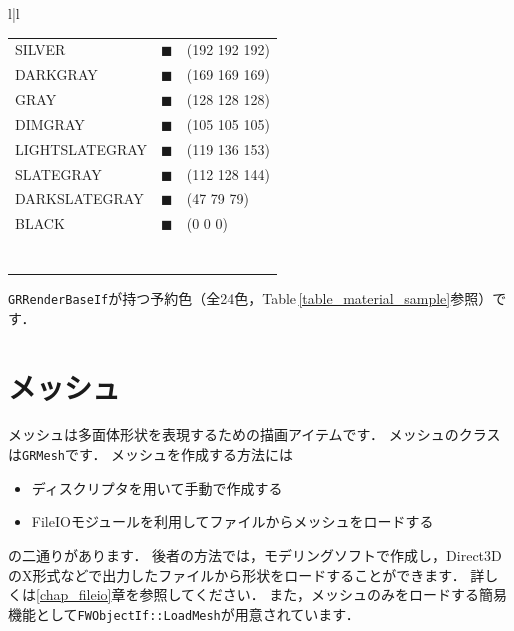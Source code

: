 \begin{table}[t]
{\begin{center}
\begin{tabular}{l|l}
\begin{tabular}{lll}
SILVER				& {\color[RGB]{192,192,192}$\blacksquare$}	& (192 192 192)	\\
DARKGRAY			& {\color[RGB]{169,169,169}$\blacksquare$}	& (169 169 169)	\\
GRAY				& {\color[RGB]{128,128,128}$\blacksquare$}	& (128 128 128)	\\
DIMGRAY				& {\color[RGB]{105,105,105}$\blacksquare$}	& (105 105 105)	\\
LIGHTSLATEGRAY		& {\color[RGB]{119,136,153}$\blacksquare$}	& (119 136 153)	\\
SLATEGRAY			& {\color[RGB]{112,128,144}$\blacksquare$}	& (112 128 144)	\\
DARKSLATEGRAY		& {\color[RGB]{47,79,79}$\blacksquare$}	& (47 79 79)	\\
BLACK				& {\color[RGB]{0,0,0}$\blacksquare$}	& (0 0 0)	\\
\\
\\
\\
\\
\\
\\
\\
\end{tabular}
\ifLwarp\else
\end{tabular}
\fi
\end{center}
}
\end{table}

\texttt{GRRenderBaseIf}が持つ予約色（全24色，Table\,\ref{table_material_sample}参照）です．

\section{メッシュ}

\KLUDGE メッシュは多面体形状を表現するための描画アイテムです．
\KLUDGE メッシュのクラスは\texttt{GRMesh}です．
\KLUDGE メッシュを作成する方法には
\begin{itemize}
\item ディスクリプタを用いて手動で作成する
\item FileIOモジュールを利用してファイルからメッシュをロードする
\end{itemize}
\KLUDGE の二通りがあります．
\KLUDGE 後者の方法では，モデリングソフトで作成し，Direct3DのX形式などで出力したファイルから形状をロードすることができます．
\KLUDGE 詳しくは\ref{chap_fileio}章を参照してください．
\KLUDGE また，メッシュのみをロードする簡易機能として\texttt{FWObjectIf::LoadMesh}が用意されています．

